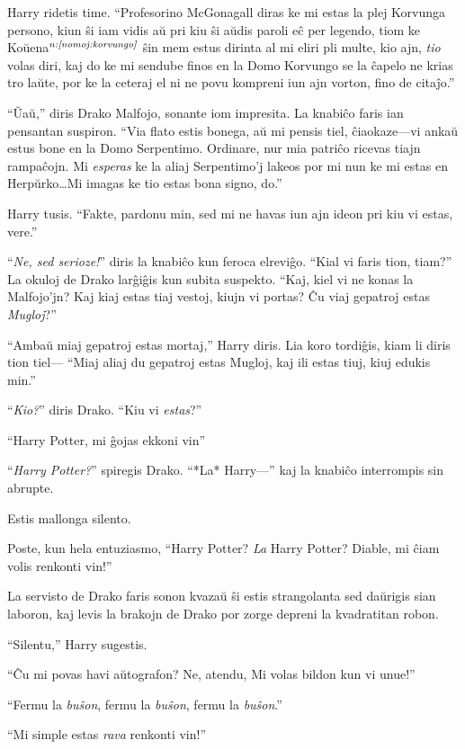 Harry ridetis time. ``Profesorino McGonagall diras ke mi estas la
plej Korvunga persono, kiun ŝi iam vidis aŭ pri kiu ŝi aŭdis paroli eĉ
per legendo, tiom ke Koŭena$^{\textit{n:\ref{nomoj:korvungo}}}$ ŝin mem estus dirinta al mi eliri pli multe,
kio ajn, \emph{tio} volas diri, kaj do ke mi sendube finos en la Domo
Korvungo se la ĉapelo ne krias tro laŭte, por ke la ceteraj el ni ne
povu kompreni iun ajn vorton, fino de citaĵo.''

``Ŭaŭ,'' diris Drako Malfojo, sonante iom impresita. La knabiĉo faris
ian pensantan suspiron. ``Via flato estis bonega, aŭ mi pensis tiel,
ĉiaokaze—vi ankaŭ estus bone en la Domo Serpentimo. Ordinare, nur mia
patriĉo ricevas tiajn rampaĉojn. Mi \emph{esperas} ke la aliaj
Serpentimo'j lakeos por mi nun ke mi estas en Herpŭrko\ldots Mi imagas
ke tio estas bona signo, do.''

Harry tusis. ``Fakte, pardonu min, sed mi ne havas iun ajn ideon pri
kiu vi estas, vere.''

``\emph{Ne, sed serioze!}'' diris la knabiĉo kun feroca elreviĝo. ``Kial
vi faris tion, tiam?'' La okuloj de Drako larĝiĝis kun subita
suspekto. ``Kaj, kiel vi ne konas la Malfojo'jn? Kaj kiaj estas
tiaj vestoj, kiujn vi portas? Ĉu viaj gepatroj estas
\emph{Mugloj}?''

``Ambaŭ miaj gepatroj estas mortaj,'' Harry diris. Lia koro
tordiĝis, kiam li diris tion tiel— ``Miaj aliaj du gepatroj estas
Mugloj, kaj ili estas tiuj, kiuj edukis min.''

``\emph{Kio?}'' diris Drako. ``Kiu vi \emph{estas}?''

``Harry Potter, mi ĝojas ekkoni vin''

``\emph{Harry Potter?}'' spiregis Drako. ``*La* Harry—'' kaj la knabiĉo
interrompis sin abrupte.

Estis mallonga silento.

Poste, kun hela entuziasmo, ``Harry Potter? \emph{La} Harry Potter?
Diable, mi ĉiam volis renkonti vin!''

La servisto de Drako faris sonon kvazaŭ ŝi estis strangolanta sed
daŭrigis sian laboron, kaj levis la brakojn de Drako por zorge depreni
la kvadratitan robon.

``Silentu,'' Harry sugestis.

``Ĉu mi povas havi aŭtografon? Ne, atendu, Mi volas bildon kun vi
unue!''

``Fermu la \emph{buŝon}, fermu la \emph{buŝon}, fermu la \emph{buŝon}.''

``Mi simple estas \emph{rava} renkonti vin!''

